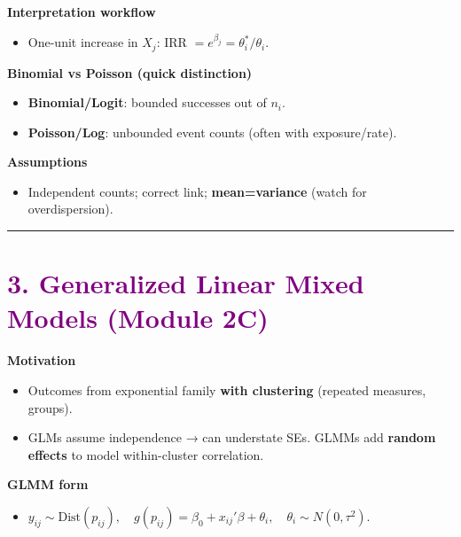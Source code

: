 \documentclass[
  letterpaper,
  DIV=11,
  numbers=noendperiod]{scrreprt}
\providecommand{\tightlist}{%
  \setlength{\itemsep}{0pt}\setlength{\parskip}{0pt}}\usepackage{longtable,booktabs,array}
\begin{document}
\textbf{Interpretation workflow}

\begin{itemize}
\tightlist
\item
  One-unit increase in \(X_j\): IRR
  \(= e^{\beta_j} = \theta_i^*/\theta_i\).
\end{itemize}

\textbf{Binomial vs Poisson (quick distinction)}

\begin{itemize}
\tightlist
\item
  \textbf{Binomial/Logit}: bounded successes out of \(n_i\).
\item
  \textbf{Poisson/Log}: unbounded event counts (often with
  exposure/rate).
\end{itemize}

\textbf{Assumptions}

\begin{itemize}
\tightlist
\item
  Independent counts; correct link; \textbf{mean=variance} (watch for
  overdispersion).
\end{itemize}

\begin{center}\rule{0.5\linewidth}{0.5pt}\end{center}

\hypertarget{section-14}{%
\section*{\texorpdfstring{\textcolor{purple}{3. Generalized Linear Mixed Models (Module 2C)}}{}}\label{section-14}}

\markright{\textcolor{purple}{3. Generalized Linear Mixed Models (Module 2C)}}

\textbf{Motivation}

\begin{itemize}
\tightlist
\item
  Outcomes from exponential family \textbf{with clustering} (repeated
  measures, groups).
\item
  GLMs assume independence → can understate SEs. GLMMs add
  \textbf{random effects} to model within-cluster correlation.
\end{itemize}

\textbf{GLMM form}

\begin{itemize}
\tightlist
\item
  \(y_{ij}\sim \text{Dist}(p_{ij}),\quad g(p_{ij})=\beta_0 + x_{ij}'\beta + \theta_i, \quad \theta_i\sim N(0,\tau^2)\).
\end{itemize}
\end{document}
